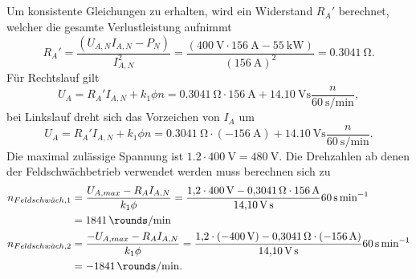 \documentclass[11pt,a4paper]{scrartcl}
\newcommand{\mybr}[1]{\left(#1\right)}
\newcommand{\0}{_{\mybr{0}}}
\newcommand{\1}{_{\mybr{1}}}
\newcommand{\2}{_{\mybr{2}}}
\begin{document}
\subsection{}
Um konsistente Gleichungen zu erhalten, wird ein Widerstand $R_A'$ berechnet, welcher die gesamte Verlustleistung aufnimmt
\begin{equation}
R_A'=\frac{\mybr{U_{A,N}I_{A,N}-P_N}}{I_{A,N}^2}=\frac{\mybr{\SI{400}{\volt}\cdot\SI{156}{\ampere}-\SI{55}{\kilo\watt}}}{\mybr{\SI{156}{\ampere}}^2}=\SI{0.3041}{\ohm}.
\end{equation}
Für Rechtslauf gilt
\begin{equation}
U_A=R_A' I_{A,N}+k_1\phi n=\SI{0.3041}{\ohm}\cdot\SI{156}{\ampere}+\SI{14.10}{\volt\second}\frac{n}{\SI{60}{\second\per\minute}},
\end{equation}
bei Linkslauf dreht sich das Vorzeichen von $I_A$ um
\begin{equation}
U_A=R_A' I_{A,N}+k_1\phi n=\SI{0.3041}{\ohm}\cdot\mybr{\SI{-156}{\ampere}}+\SI{14.10}{\volt\second}\frac{n}{\SI{60}{\second\per\minute}}.
\end{equation}
Die maximal zulässige Spannung ist $\num{1.2}\cdot\SI{400}{\volt}=\SI{480}{\volt}$.
Die Drehzahlen ab denen der Feldschwächbetrieb verwendet werden muss berechnen sich zu
\begin{align}
n_{Feldschw\ddot{a}ch,1}&=\frac{U_{A,max}-R_A I_{A,N}}{k_1\phi}=\frac{\num{1.2}\cdot\SI{400}{\volt}-\SI{0.3041}{\ohm}\cdot\SI{156}{\ampere}}{\SI{14.10}{\volt\second}}\SI{60}{\second\per\minute}\\
&=\SI{1841}{\rounds\per\minute}\\
n_{Feldschw\ddot{a}ch,2}&=\frac{-U_{A,max}-R_A I_{A,N}}{k_1\phi}=\frac{\num{1.2}\cdot\mybr{\SI{-400}{\volt}}-\SI{0.3041}{\ohm}\cdot\mybr{\SI{-156}{\ampere}}}{\SI{14.10}{\volt\second}}\SI{60}{\second\per\minute}\\
&=\SI{-1841}{\rounds\per\minute}.
\end{align}
\begin{figure*}[!htb]
\centering
{}
\end{figure*}
\end{document}

